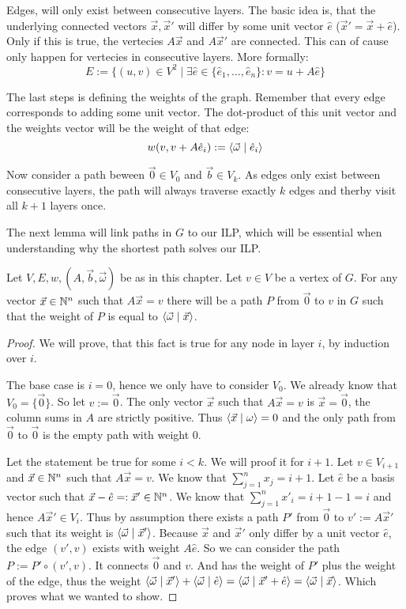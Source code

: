Edges, will only exist between consecutive layers. The basic idea is, that the underlying connected vectors $\vec x, \vec x'$ will differ by some unit vector $\hat e$ ($\vec x' = \vec x + \hat e$). Only if this is true, the vertecies $A\vec x$ and $A\vec x'$ are connected. This can of cause only happen for vertecies in consecutive layers. More formally: 
$$E := \{(u, v) \in V^2\mid \exists \hat e \in \{\hat e_1, \dots, \hat e_n\}\colon v = u + A\hat e\}$$

The last steps is defining the weights of the graph. Remember that every edge corresponds to adding some unit vector. The dot-product of this unit vector and the weights vector will be the weight of that edge:
$$w(v, v + A\hat e_i) := \langle \vec \omega \mid \hat e_i \rangle$$

Now consider a path beween $\vec 0\in V_0$ and $\vec b \in V_k$. As edges only exist between consecutive layers, the path will always traverse exactly $k$ edges and therby visit all $k+1$ layers once.

The next lemma will link paths in $G$ to our ILP, which will be essential when understanding why the shortest path solves our ILP.

\begin{lemma}
    Let $V, E, w, (A, \vec b, \vec \omega)$ be as in this chapter. Let $v \in V$ be a vertex of $G$. For any vector $\vec x \in \mathbb{N}^n$ such that $A\vec x = v$ there will be a path $P$ from $\vec 0$ to $v$ in $G$ such that the weight of $P$ is equal to $\langle \vec\omega \mid \vec x \rangle$. 
\end{lemma}
\begin{proof}
    We will prove, that this fact is true for any node in layer $i$, by induction over $i$. 
    
    The base case is $i=0$, hence we only have to consider $V_0$. We already know that $V_0 = \{\vec0\}$. So let $v := \vec 0$. The only vector $\vec x$ such that $A\vec x = v$ is $\vec x = \vec 0$, the column sums in $A$ are strictly positive. Thus $\langle \vec x \mid \omega \rangle = 0$ and the only path from $\vec 0$ to $\vec 0$ is the empty path with weight 0.
    
    Let the statement be true for some $i < k$. We will proof it for $i+1$. Let $v \in V_{i+1}$ and $\vec x \in \mathbb{N}^n$ such that $A\vec x = v$. We know that $\sum_{j=1}^n x_j = i+1$. Let $\hat e$ be a basis vector such that $\vec x - \hat e =: \vec x' \in \mathbb{N}^n$. We know that $\sum_{j=1}^{n} x'_i = i+1-1=i$ and hence $A\vec x' \in V_i$. Thus by assumption there exists a path $P'$ from $\vec 0$ to $v' := A\vec x'$ such that its weight is $\langle \vec \omega \mid \vec x' \rangle$. Because $\vec x$ and $\vec x'$ only differ by a unit vector $\hat e$, the edge $(v', v)$ exists with weight $A\hat e$. So we can consider the path $P := P' \circ (v', v)$. It connects $\vec 0$ and $v$. And has the weight of $P'$ plus the weight of the edge, thus the weight $\langle \vec \omega \mid \vec x' \rangle + \langle \vec\omega \mid \hat e \rangle = \langle \vec \omega \mid \vec x' + \hat e \rangle = \langle \vec \omega \mid \vec x \rangle$. Which proves what we wanted to show.
\end{proof}

